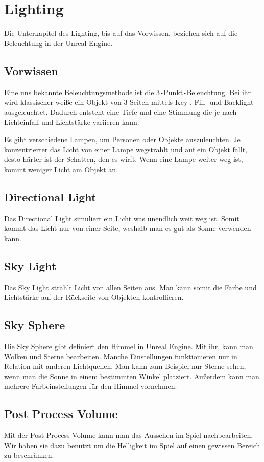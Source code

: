 \section{Lighting}
Die Unterkapitel des Lighting, bis auf das Vorwissen, beziehen sich auf die Beleuchtung in der Unreal Engine.

\subsection{Vorwissen}
Eine uns bekannte Beleuchtungsmethode ist die 3\verb+-+Punkt\verb+-+Beleuchtung. Bei ihr wird klassischer weiße ein Objekt
von 3 Seiten mittels Key-, Fill- und Backlight ausgeleuchtet. Dadurch entsteht eine Tiefe und eine Stimmung die je nach Lichteinfall und
Lichtstärke variieren kann.

Es gibt verschiedene Lampen, um Personen oder Objekte auszuleuchten. Je konzentrierter das Licht von einer Lampe wegstrahlt und auf ein Objekt
fällt, desto härter ist der Schatten, den es wirft. Wenn eine Lampe weiter weg ist, kommt weniger Licht am Objekt an.

\subsection{Directional Light}
Das Directional Light simuliert ein Licht was unendlich weit weg ist. Somit kommt das Licht nur von einer Seite, weshalb
man es gut als Sonne verwenden kann. \citep{unreal:directional_light}

\subsection{Sky Light}
Das Sky Light strahlt Licht von allen Seiten aus. Man kann somit die Farbe und Lichtstärke auf der Rückseite von Objekten kontrollieren.

\subsection{Sky Sphere}
Die Sky Sphere gibt definiert den Himmel in Unreal Engine. Mit ihr, kann man Wolken und Sterne bearbeiten. Manche Einstellungen funktionieren nur in Relation mit anderen
Lichtquellen. Man kann zum Beispiel nur Sterne sehen, wenn man die Sonne in einem bestimmten Winkel platziert.
Außerdem kann man mehrere Farbeinstellungen für den Himmel vornehmen.

\subsection{Post Process Volume}
Mit der Post Process Volume kann man das Aussehen im Spiel nachbearbeiten. \citep{unreal:postProcessVolume} Wir haben sie dazu benutzt um die Helligkeit im Spiel auf einen gewissen Bereich zu beschränken.

